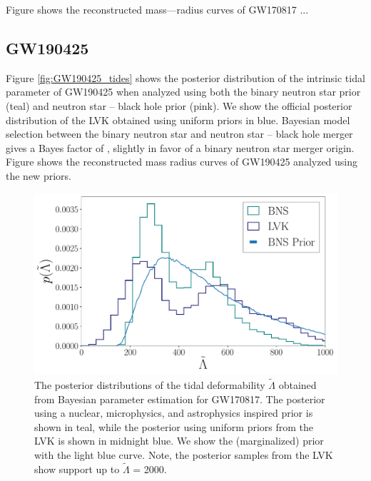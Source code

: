 \documentclass[twocolumn]{aastex631}
\begin{document}
	Figure  shows the reconstructed mass---radius curves of GW170817 ... 
	\subsection{GW190425}
	Figure \ref{fig:GW190425_tides} shows the posterior distribution of the intrinsic tidal parameter of GW190425 when analyzed using both the binary neutron star prior (teal) and neutron star -- black hole prior (pink). We show the official posterior distribution  of the LVK obtained using uniform priors in blue. 
	Bayesian model selection between the binary neutron star and neutron star -- black hole merger gives a Bayes factor of , slightly in favor of a binary neutron star merger origin. 
	Figure  shows the reconstructed mass radius curves of GW190425 analyzed using the new priors.  
	\begin{figure}
		\centering
		\includegraphics[width=1.\linewidth]{Fig_2_GW170817_lambda_tilde_posteriors_BNS.pdf}
		\caption{The posterior distributions of the tidal deformability $\tilde{\Lambda}$ obtained from Bayesian parameter estimation for GW170817. The posterior using a nuclear, microphysics, and astrophysics inspired prior is shown in teal, while the posterior using uniform priors from the LVK is shown in midnight blue. We show the (marginalized) prior with the light blue curve. Note, the posterior samples from the LVK show support up to $\tilde{\Lambda}$ = 2000. }
		\label{fig:GW170817_tides}
	\end{figure}
	
\end{document}

